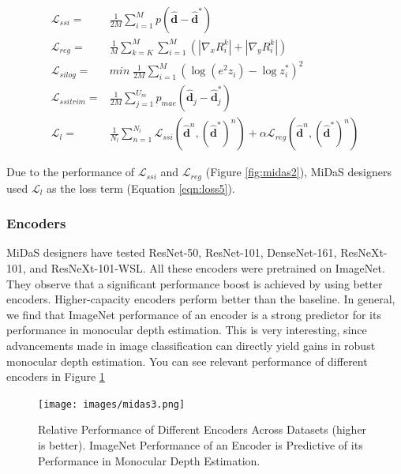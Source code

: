 \documentclass[a4paper, openany]{book}
\begin{document}
\begin{eqnarray}
\mathcal{L}_{ssi} =& \frac{1}{2M} \sum_{i=1}^{M} p(\hat{\mathbf{d}}-\hat{\mathbf{d}}^{*}) \label{eqn:loss1} \\ 
\mathcal{L}_{reg} =& \frac{1}{M} \sum_{k=K}^{M} \sum_{i=1}^{M}(|\nabla_x R_i^k|+|\nabla_y R_i^k|)  \label{eqn:loss2} \\
\mathcal{L}_{silog} =& min\;\frac{1}{2M} \sum_{i=1}^{M} (\log(e^2z_i)-\log{z_i^*})^2  \label{eqn:loss3} \\
\mathcal{L}_{ssitrim} =&\frac{1}{2M} \sum_{j=1}^{U_m} p_{mae}(\hat{\mathbf{d}}_j - \hat{\mathbf{d}}_j^*)  \label{eqn:loss4} \\
\mathcal{L}_{l} =& \frac{1}{N_{l}} \sum_{n=1}^{N_{l}} \mathcal{L}_{s s i}\left(\hat{\mathbf{d}}^{n},\left(\hat{\mathbf{d}}^{*}\right)^{n}\right)+\alpha \mathcal{L}_{r e g}\left(\hat{\mathbf{d}}^{n},\left(\hat{\mathbf{d}}^{*}\right)^{n}\right)  \label{eqn:loss5} 
\end{eqnarray}


Due to the performance of $\mathcal{L}_{ssi}$ and $\mathcal{L}_{reg}$ (Figure \ref{fig:midas2}), MiDaS designers used $\mathcal{L}_{l}$ as the loss term (Equation \ref{eqn:loss5}).
\newpage
		
\subsubsection{Encoders}
		\vspace{0.3cm}
		
MiDaS designers have tested ResNet-50, ResNet-101, DenseNet-161, ResNeXt-101, and ResNeXt-101-WSL. All these encoders were pretrained on ImageNet. They observe that a significant performance boost is achieved by using better encoders. Higher-capacity encoders perform better than the baseline. 
In general, we find that ImageNet performance of an encoder is a strong predictor for its performance in monocular depth estimation. This is very interesting, since advancements made in image classification can directly yield gains in robust monocular depth estimation. You can see relevant performance of different encoders in Figure \ref{fig:midas3}
		
		
\begin{figure}[ht]
  \centering
    \texttt{[image: images/midas3.png]}
      \caption{Relative Performance of Different Encoders Across Datasets (higher is better). ImageNet Performance of an Encoder is Predictive of its Performance in Monocular Depth Estimation.}
  \label{fig:midas3}
\end{figure}
		
\end{document}
